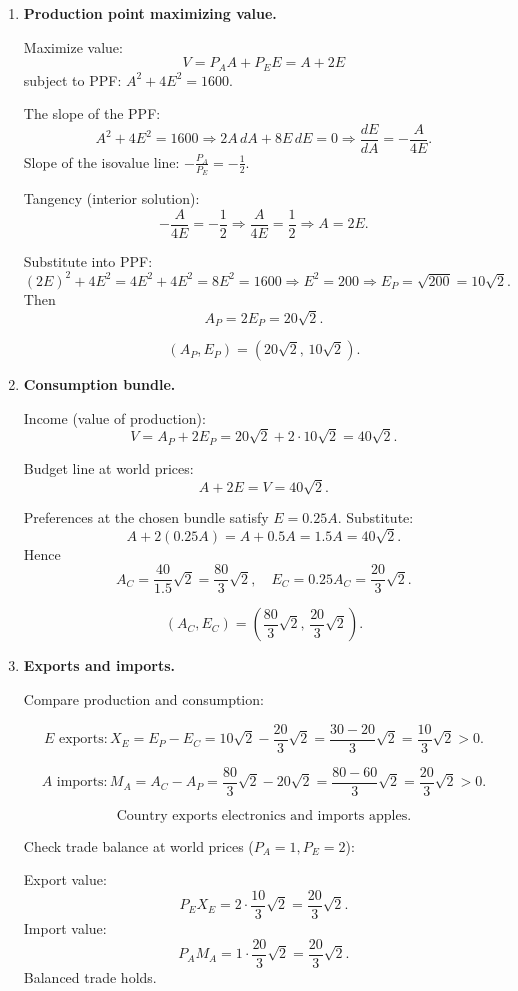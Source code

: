 \documentclass[12pt]{article}
\begin{document}
\begin{enumerate}[label=(\arabic*)]

\item \textbf{Production point maximizing value.}

Maximize value:
\[
V = P_A A + P_E E = A + 2E
\]
subject to PPF: $A^2 + 4E^2 = 1600$.

The slope of the PPF:
\[
A^2 + 4E^2 = 1600 \Rightarrow 2A\,dA + 8E\,dE = 0 \Rightarrow \frac{dE}{dA} = -\frac{A}{4E}.
\]
Slope of the isovalue line: $-\frac{P_A}{P_E} = -\frac{1}{2}$.

Tangency (interior solution):
\[
-\frac{A}{4E} = -\frac{1}{2} \Rightarrow \frac{A}{4E} = \frac{1}{2} \Rightarrow A = 2E.
\]

Substitute into PPF:
\[
(2E)^2 + 4E^2 = 4E^2 + 4E^2 = 8E^2 = 1600 \Rightarrow E^2 = 200 \Rightarrow E_P = \sqrt{200} = 10\sqrt{2}.
\]
Then
\[
A_P = 2E_P = 20\sqrt{2}.
\]

\[
\boxed{(A_P,E_P) = (20\sqrt{2},\,10\sqrt{2}).}
\]

\item \textbf{Consumption bundle.}

Income (value of production):
\[
V = A_P + 2E_P = 20\sqrt{2} + 2\cdot 10\sqrt{2} = 40\sqrt{2}.
\]

Budget line at world prices:
\[
A + 2E = V = 40\sqrt{2}.
\]

Preferences at the chosen bundle satisfy $E = 0.25A$. Substitute:
\[
A + 2(0.25A) = A + 0.5A = 1.5A = 40\sqrt{2}.
\]
Hence
\[
A_C = \frac{40}{1.5}\sqrt{2} = \frac{80}{3}\sqrt{2}, \quad
E_C = 0.25A_C = \frac{20}{3}\sqrt{2}.
\]

\[
\boxed{(A_C,E_C) = \left(\frac{80}{3}\sqrt{2},\,\frac{20}{3}\sqrt{2}\right).}
\]

\item \textbf{Exports and imports.}

Compare production and consumption:

\[
E\text{ exports}: X_E = E_P - E_C = 10\sqrt{2} - \frac{20}{3}\sqrt{2}
= \frac{30 - 20}{3}\sqrt{2} = \frac{10}{3}\sqrt{2} >0.
\]

\[
A\text{ imports}: M_A = A_C - A_P = \frac{80}{3}\sqrt{2} - 20\sqrt{2}
= \frac{80 - 60}{3}\sqrt{2} = \frac{20}{3}\sqrt{2} >0.
\]

\[
\boxed{\text{Country exports electronics and imports apples.}}
\]

Check trade balance at world prices ($P_A=1,P_E=2$):

Export value:
\[
P_E X_E = 2 \cdot \frac{10}{3}\sqrt{2} = \frac{20}{3}\sqrt{2}.
\]
Import value:
\[
P_A M_A = 1 \cdot \frac{20}{3}\sqrt{2} = \frac{20}{3}\sqrt{2}.
\]
Balanced trade holds.


\end{enumerate}
\end{document}

